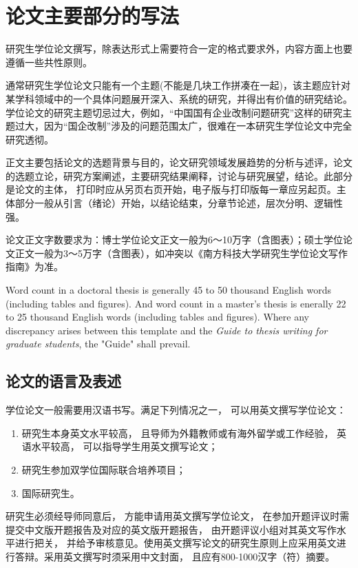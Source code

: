 
\chapter{论文主要部分的写法}

研究生学位论文撰写，除表达形式上需要符合一定的格式要求外，内容方面上也要遵循一些共性原则。

通常研究生学位论文只能有一个主题(不能是几块工作拼凑在一起)，该主题应针对某学科领域中的一个具体问题展开深入、系统的研究，并得出有价值的研究结论。
学位论文的研究主题切忌过大，例如，“中国国有企业改制问题研究”这样的研究主题过大，因为“国企改制”涉及的问题范围太广，很难在一本研究生学位论文中完全研究透彻。

正文主要包括论文的选题背景与目的，论文研究领域发展趋势的分析与述评，论文的选题立论，研究方案阐述，主要研究结果阐释，讨论与研究展望，结论。此部分是论文的主体， 打印时应从另页右页开始，电子版与打印版每一章应另起页。主体部分一般从引言（绪论）开始，以结论结束，分章节论述，层次分明、逻辑性强。

论文正文字数要求为：博士学位论文正文一般为6～10万字（含图表）；硕士学位论文正文一般为3～5万字（含图表），如冲突以《南方科技大学研究生学位论文写作指南》为准。

Word count in a doctoral thesis is generally 45 to 50 thousand English words (including tables and figures). And word count in a master’s thesis is enerally 22 to 25 thousand English words (including tables and figures). Where any discrepancy arises between this template and the \textit{Guide to thesis writing for graduate students}, the "Guide" shall prevail.


\section{论文的语言及表述}

学位论文一般需要用汉语书写。满足下列情况之一， 可以用英文撰写学位论文：

\begin{enumerate}
\item 研究生本身英文水平较高， 且导师为外籍教师或有海外留学或工作经验， 英语水平较高， 可以指导学生用英文撰写论文；
\item 研究生参加双学位国际联合培养项目；
\item 国际研究生。
\end{enumerate}

研究生必须经导师同意后， 方能申请用英文撰写学位论文， 在参加开题评议时需提交中文版开题报告及对应的英文版开题报告， 由开题评议小组对其英文写作水平进行把关， 并给予审核意见。使用英文撰写论文的研究生原则上应采用英文进行答辩。采用英文撰写时须采用中文封面， 且应有800-1000汉字（符）摘要。

